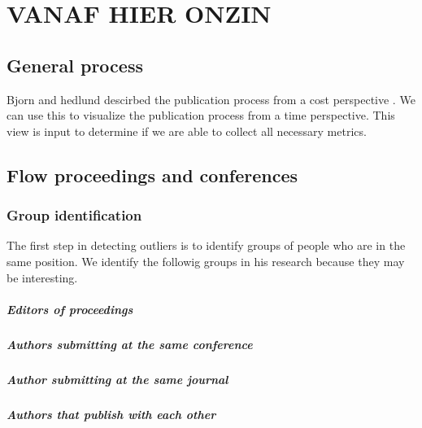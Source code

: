 \documentclass{ou-report}
\begin{document}
\chapter{VANAF HIER ONZIN}

\section{General process}
Bjorn and hedlund descirbed the publication process from a cost perspective 
\cite{BH2004}. We can use this to visualize the publication process from a time 
perspective. This view is input to determine if we are able to collect all 
necessary metrics.



\section{Flow proceedings and conferences}


\subsection{Group identification}
The first step in detecting outliers is to identify groups of people who are in 
the same position. We identify the followig groups in his research because they
may be interesting.

\paragraph{Editors of proceedings}

\paragraph{Authors submitting at the same conference}

\paragraph{Author submitting at the same journal}

\paragraph{Authors that publish with each other}
\end{document}
